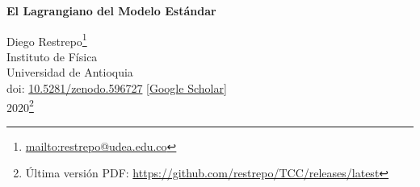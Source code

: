 \documentclass[12pt]{book}
\theoremstyle{example}
\newcommand{\tofc}[1]{#1} %
\begin{document}
\renewcommand{\thepage}{\roman{page}}
\begin{titlepage}
  \begin{center}

    
\textbf{\huge   El Lagrangiano del Modelo Estándar}

    

\vspace{4cm}
 Diego Restrepo\footnote{\url{mailto:restrepo@udea.edu.co}}\\
Instituto de Física\\
Universidad de Antioquia\\
doi: \href{http://doi.org/10.5281/zenodo.596727}{10.5281/zenodo.596727} [\href{https://scholar.google.com/scholar_lookup?hl=en&title=El+Lagrangiano+del+Modelo+Est%C3%A1ndar&author=D+Restrepo}{Google Scholar}]\\
2020\footnote{Última versión PDF: \url{https://github.com/restrepo/TCC/releases/latest}}
    
  \end{center}
\end{titlepage}





\tofc{
\renewcommand{\thepage}{\roman{page}}
\tableofcontents{}

\newpage{}
}





\renewcommand{\thepage}{\arabic{page}}
\setcounter{page}{1}
%






%



%
\appendix



%


\end{document}
